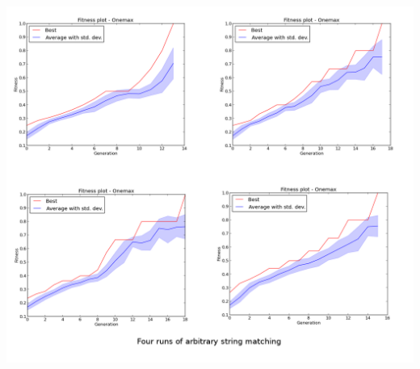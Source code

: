 \documentclass[a4paper,12pt]{article}
\begin{document}

\centerline{\includegraphics[width=1.1\textwidth]{graph_bundle_3}}
\end{document}
